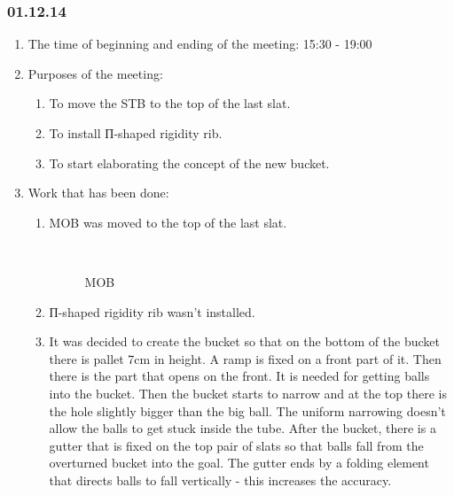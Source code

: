 \subsubsection{01.12.14}

\begin{enumerate}
	\item The time of beginning and ending of the meeting:
	15:30 - 19:00
	\item Purposes of the meeting:
	\begin{enumerate}
		\item To move the STB to the top of the last slat.
		
		\item To install П-shaped rigidity rib.
		
		\item To start elaborating the concept of the new bucket.
		
	\end{enumerate}
	\item Work that has been done:
	\begin{enumerate}
		\item MOB was moved to the top of the last slat.
		
		\begin{figure}[H]
			\begin{minipage}[h]{0.2\linewidth}
				\center  
			\end{minipage}
			\begin{minipage}[h]{0.6\linewidth}
				\caption{MOB}
			\end{minipage}
		\end{figure}
		
		\item П-shaped rigidity rib wasn't installed.
		
		\item It was decided to create the bucket so that on the bottom of the bucket there is pallet 7cm in height. A ramp is fixed on a front part of it. Then there is the part that opens on the front. It is needed for getting balls into the bucket. Then the bucket starts to narrow and at the top there is the hole slightly bigger than the big ball. The uniform narrowing doesn't allow the balls to get stuck inside the tube. After the bucket, there is a gutter that is fixed on the top pair of slats so that balls fall from the overturned bucket into the goal. The gutter ends by a folding element that directs balls to fall vertically - this increases the accuracy.
		

\end{enumerate}
\end{enumerate}
